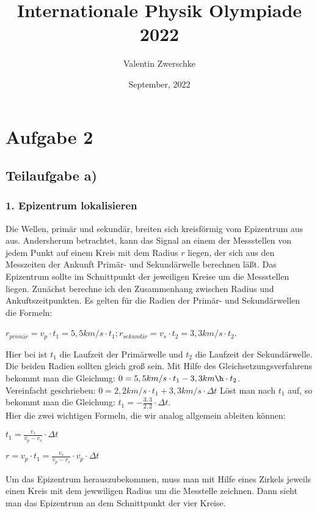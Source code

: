 \documentclass{article}
\title{Internationale Physik Olympiade 2022}
\author{Valentin Zwerschke}
\date{September, 2022}
\begin{document}
\maketitle
\section*{Aufgabe 2}
\subsection*{Teilaufgabe a)}
\subsubsection*{1. Epizentrum lokalisieren}
Die Wellen, primär und sekundär, breiten sich kreisförmig vom Epizentrum aus aus. Andersherum betrachtet, kann das Signal an einem der Messstellen von jedem Punkt auf einem Kreis mit dem Radius $r$ liegen, 
der sich aus den Messzeiten der Ankunft Primär- und Sekundärwelle berechnen läßt. 
Das Epizentrum sollte im Schnittpunkt der jeweiligen Kreise um die Messstellen liegen. 
Zunächst berechne ich den Zusammenhang zwischen Radius und Ankuftszeitpunkten. 
Es gelten für die Radien der Primär- und Sekundärwellen die Formeln: 
\begin{center}
$r_{primär} = v_p \cdot t_1= 5,5 km/s \cdot t_1 ; r_{sekundär} = v_s\cdot t_2 = 3,3 km/s \cdot t_2$.
\end{center}
Hier bei ist $t_1$ die Laufzeit der Primärwelle und $t_2$ die Laufzeit der Sekundärwelle.\\
Die beiden Radien sollten gleich groß sein. Mit Hilfe des Gleichsetzungsverfahrens bekommt man die Gleichung: \space \space $0 = 5,5 km/s \cdot t_1 - 3,3 km\h \cdot t_2$.\\Vereinfacht geschrieben: $0 = 2,2 km/s \cdot t_1  + 3,3 km/s \cdot \Delta t$
Löst man nach $t_1$ auf, so bekommt man die Gleichung: $t_1 = - \frac{3,3}{2,2} \cdot \Delta t$.\\
Hier die zwei wichtigen Formeln, die wir analog allgemein ableiten können: 
\begin{center}
	\item $t_1 = \frac{v_s }{v_p - v_s}\cdot \Delta t$\\
	\item $r = v_p \cdot t_1 = \frac{v_s}{v_p - v_s} \cdot v_p \cdot \Delta t$
\end{center}
Um das Epizentrum herauszubekommen, muss man mit Hilfe eines Zirkels jeweils einen Kreis mit dem jewwiligen Radius um die Messtelle zeichnen. Dann sieht man das Epizentrum an dem Schnittpunkt der vier Kreise.\\
\end{document}
